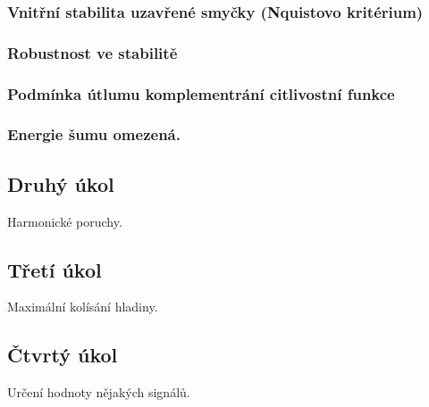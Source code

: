 \documentclass[a4paper,11pt]{article}
\begin{document}
\subsubsection{Vnitřní stabilita uzavřené smyčky (Nquistovo kritérium)}
\subsubsection{Robustnost ve stabilitě}
\subsubsection{Podmínka útlumu komplementrání citlivostní funkce}
\subsubsection{Energie šumu omezená.}
\subsection{Druhý úkol}
Harmonické poruchy.
\subsection{Třetí úkol}
Maximální kolísání hladiny.
\subsection{Čtvrtý úkol}
Určení hodnoty nějakých signálů.
\end{document}
